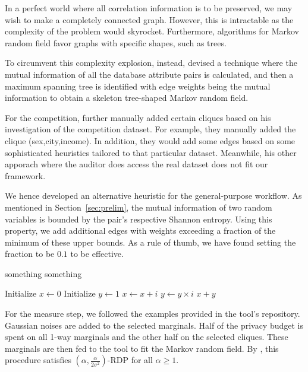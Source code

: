 \documentclass[manuscript,screen,review,anonymous]{acmart}
\begin{document}
In a perfect world where all correlation information is to be preserved, we may wish to make a completely connected graph. However, this is intractable as the complexity of the problem would skyrocket. Furthermore, algorithms for Markov random field favor graphs with specific shapes, such as trees.

To circumvent this complexity explosion, instead, \cite{mckenna2021winning} devised a technique where the mutual information of all the database attribute pairs is calculated, and then a maximum spanning tree is identified with edge weights being the mutual information to obtain a skeleton tree-shaped Markov random field.

For the competition, \cite{mckenna2021winning} further manually added certain cliques based on his investigation of the competition dataset. For example, they manually added the clique (sex,city,income). In addition, they would add some edges based on some sophisticated heuristics tailored to that particular dataset. Meanwhile, his other apporach where the auditor does access the real dataset does not fit our framework.

We hence developed an alternative heuristic for the general-purpose workflow. As mentioned in Section~\ref{sec:prelim}, the mutual information of two random variables is bounded by the pair's respective Shannon entropy. Using this property, we add additional edges with weights exceeding a fraction of the minimum of these upper bounds. As a rule of thumb, we have found setting the fraction to be $0.1$ to be effective.

\begin{algorithm}
\caption{something something}
\label{alg:heuristic}
\begin{algorithmic}[1]
\STATE Initialize $x \gets 0$
\STATE Initialize $y \gets 1$
        \STATE $x \gets x + i$
    \ELSE
        \STATE $y \gets y \times i$
    \ENDIF
\ENDFOR
\RETURN $x + y$
\end{algorithmic}
\end{algorithm}

For the measure step, we followed the examples provided in the tool's repository. Gaussian noises are added to the selected marginals. Half of the privacy budget is spent on all 1-way marginals and the other half on the selected cliques. These marginals are then fed to the tool to fit the Markov random field. By \cite{mckenna2021winning}, this procedure satisfies $(\alpha,\frac{\alpha}{2 \sigma^2})$-RDP for all $\alpha \geq 1$.
\end{document}
